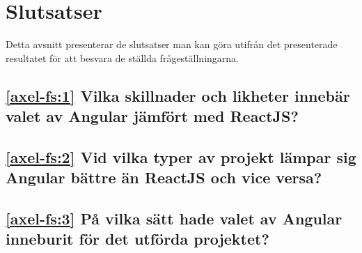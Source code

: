 \section{Slutsatser}
\label{sec:axel-conclusion}

Detta avsnitt presenterar de slutsatser man kan göra utifrån det presenterade resultatet för att besvara de ställda frågeställningarna.

\subsection*{\ref{axel-fs:1} Vilka skillnader och likheter innebär valet av Angular jämfört med ReactJS?}

\subsection*{\ref{axel-fs:2} Vid vilka typer av projekt lämpar sig Angular bättre än ReactJS och vice versa?}
 
\subsection*{\ref{axel-fs:3} På vilka sätt hade valet av Angular inneburit för det utförda projektet?}
